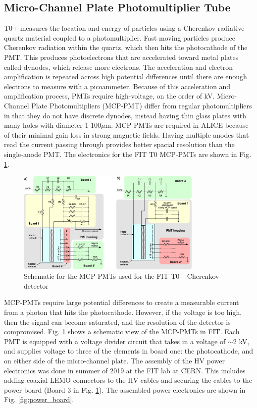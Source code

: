 \subsection{Micro-Channel Plate Photomultiplier Tube}
T0+ measures the location and energy of particles using a Cherenkov radiative quartz material coupled to a photomultiplier. Fast moving particles produce Cherenkov radiation within the quartz, which then hits the photocathode of the PMT. This produces photoelectrons that are accelerated toward metal plates called dynodes, which release more electrons. The acceleration and electron amplification is repeated across high potential differences until there are enough electrons to measure with a picoammeter. Because of this acceleration and amplification process, PMTs require high-voltage, on the order of kV. Micro-Channel Plate Photomultipliers (MCP-PMT) differ from regular photomultipliers in that they do not have discrete dynodes, instead having thin glass plates with many holes with diameter 1-100$\mu$m. MCP-PMTs are required in ALICE because of their minimal gain loss in strong magnetic fields. Having multiple anodes that read the current passing through provides better spacial resolution than the single-anode PMT. The electronics for the FIT T0 MCP-PMTs are shown in Fig. \ref{fig:MCP_PMT_Schematic}.
\begin{figure}[H]
    \centering
    \includegraphics[width=0.8\textwidth]{figures/FIT/PMT_Schematic.jpg} 
    \caption{Schematic for the MCP-PMTs used for the FIT T0+ Cherenkov detector \cite{Yury_MCP-PMT}}
    \label{fig:MCP_PMT_Schematic}
\end{figure}



MCP-PMTs require large potential differences to create a measurable current from a photon that hits the photocathode. However, if the voltage is too high, then the signal can become saturated, and the resolution of the detector is compromised. Fig. \ref{fig:MCP_PMT_Schematic} shows a schematic view of the MCP-PMTs in FIT. Each PMT is equipped with a voltage divider circuit that takes in a voltage of $\sim$2 kV, and supplies voltage to three of the elements in board one: the photocathode, and on either side of the micro-channel plate. The assembly of the HV power electronics was done in summer of 2019 at the FIT lab at CERN. This includes adding coaxial LEMO connectors to the HV cables and securing the cables to the power board (Board 3 in Fig. \ref{fig:MCP_PMT_Schematic}). The assembled power electronics are shown in Fig. \ref{fig:power_board}.

